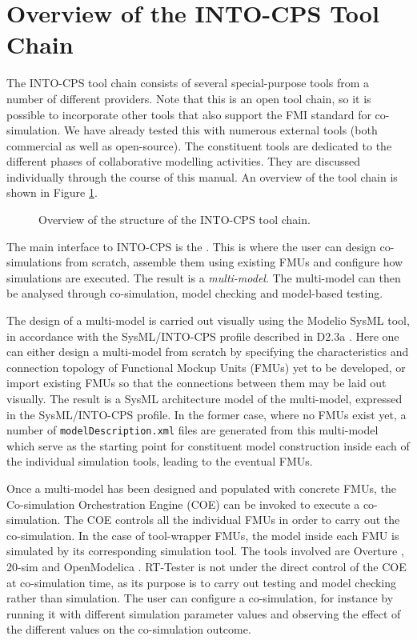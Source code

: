 \section{Overview of the INTO-CPS Tool Chain}\label{sec:overview}
The INTO-CPS tool chain consists of several special-purpose tools from a number of different providers.
%
Note that this is an open tool chain, so it is possible to incorporate other tools that also support the FMI standard for co-simulation.
%
We have already tested this with numerous external tools (both commercial as well as open-source).
%
The constituent tools are dedicated to the different phases of collaborative modelling activities.
%
They are discussed individually through the course of this manual.
%
An overview of the tool chain is shown in Figure \ref{figure:toolchainoverview}.
%
%
%
\begin{figure}[ht]
\centering

\caption{Overview of the structure of the INTO-CPS tool chain.}
\label{figure:toolchainoverview}
\end{figure}
%
%
%
The main interface to INTO-CPS is the \intoapp.
%
This is where the user can design co-simulations from scratch, assemble them using existing FMUs and configure how simulations are executed.
%
The result is a \emph{multi-model}.
%
The multi-model can then be analysed through co-simulation, model checking and model-based testing.

The design of a multi-model is carried out visually using the Modelio SysML tool, in accordance with the SysML/INTO-CPS profile described in D2.3a \cite{INTOCPSD2.3a}.
%
Here one can either design a multi-model from scratch by specifying the characteristics and connection topology of Functional Mockup Units (FMUs) yet to be developed, or import existing FMUs so that the connections between them may be laid out visually.
%
The result is a SysML architecture model of the multi-model, expressed in the SysML/INTO-CPS profile.
%
In the former case, where no FMUs exist yet, a number of \texttt{model\allowbreak{}Description\allowbreak{}.xml} files are generated from this multi-model which serve as the starting point for constituent model construction inside each of the individual simulation tools, leading to the eventual FMUs.

Once a multi-model has been designed and populated with concrete FMUs, the Co-simulation Orchestration Engine (COE) can be invoked to execute a co-simulation.
%
The COE controls all the individual FMUs in order to carry out the co-simulation.
%
In the case of tool-wrapper FMUs, the model inside each FMU is simulated by its corresponding simulation tool.
%
The tools involved are Overture \cite{Larsen&10a}, 20-sim \cite{20sim} and OpenModelica \cite{OpenModelica}.
%
RT-Tester is not under the direct control of the COE at co-simulation time, as its purpose is to carry out testing and model checking rather than simulation.
%
The user can configure a co-simulation, for instance by running it with different simulation parameter values and observing the effect of the different values on the co-simulation outcome.

